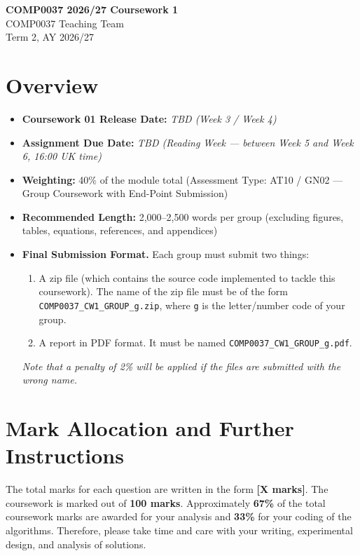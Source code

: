 \documentclass[11pt,a4paper]{article}
\begin{document}
\begin{center}
    {\LARGE \textbf{COMP0037 2026/27 Coursework 1}}\\[0.5em]
    {\large COMP0037 Teaching Team}\\[0.3em]
    {\normalsize Term 2, AY 2026/27}
\end{center}

\section*{Overview}
\begin{itemize}[leftmargin=1.5em, itemsep=0.25em]
    \item \textbf{Coursework 01 Release Date:} \textit{TBD (Week 3 / Week 4)}
    \item \textbf{Assignment Due Date:} \textit{TBD (Reading Week --- between Week 5 and Week 6, 16:00 UK time)}
    \item \textbf{Weighting:} 40\% of the module total (Assessment Type: AT10 / GN02 --- Group Coursework with End-Point Submission)
    \item \textbf{Recommended Length:} 2,000--2,500 words per group (excluding figures, tables, equations, references, and appendices)
    \item \textbf{Final Submission Format.} Each group must submit two things:
    \begin{enumerate}[label=\arabic*., leftmargin=1.8em, itemsep=0.2em]
        \item A zip file (which contains the source code implemented to tackle this coursework). The name of the zip file must be of the form \texttt{COMP0037\_CW1\_GROUP\_g.zip}, where \texttt{g} is the letter/number code of your group.
        \item A report in PDF format. It must be named \texttt{COMP0037\_CW1\_GROUP\_g.pdf}.
    \end{enumerate}
    \textit{Note that a penalty of 2\% will be applied if the files are submitted with the wrong name.}
\end{itemize}

\section*{Mark Allocation and Further Instructions}
The total marks for each question are written in the form \textbf{[X marks]}. The coursework is marked out of \textbf{100 marks}. Approximately \textbf{67\%} of the total coursework marks are awarded for your analysis and \textbf{33\%} for your coding of the algorithms. Therefore, please take time and care with your writing, experimental design, and analysis of solutions.
\end{document}
